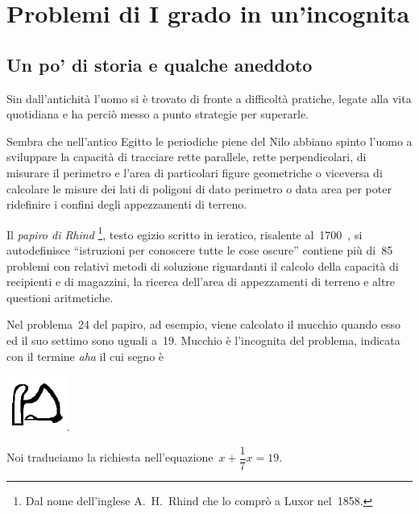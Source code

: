 
\chapter{Problemi di I grado in un'incognita}

\section{Un po' di storia e qualche aneddoto}
\label{sec:14_storia}

Sin dall'antichità l'uomo si è
trovato di fronte a difficoltà pratiche, legate alla vita quotidiana
e ha perciò messo a punto strategie per superarle.

Sembra che nell'antico Egitto le periodiche piene del
Nilo abbiano spinto l'uomo a sviluppare la capacità
di tracciare rette parallele, rette perpendicolari, di misurare il
perimetro e l'area di particolari figure geometriche o
viceversa di calcolare le misure dei lati di poligoni di dato perimetro
o data area per poter ridefinire i confini degli appezzamenti di
terreno.

Il \emph{papiro di Rhind}
\footnote{Dal nome dell'inglese A.~H.~Rhind che lo comprò a Luxor nel~1858.}, 
testo egizio scritto in
ieratico, risalente al~1700~\aC, si autodefinisce
``istruzioni per conoscere tutte le cose
oscure'' contiene più di~85 problemi con relativi
metodi di soluzione riguardanti il calcolo della capacità di
recipienti e di magazzini, la ricerca dell'area di
appezzamenti di terreno e altre questioni aritmetiche.

Nel problema~24 del papiro, ad esempio, viene calcolato il mucchio
quando esso ed il suo settimo sono uguali a~19. Mucchio è
l'incognita del problema, indicata con il termine
\emph{aha} il cui segno è
% 
\begin{inaccessibleblock}[Geroglifico]
 \includegraphics[scale=0.28]{img/giero.png}.
\end{inaccessibleblock}
                                                                  
Noi traduciamo la richiesta nell'equazione~\(x+\dfrac{1}{7}x=19\).

